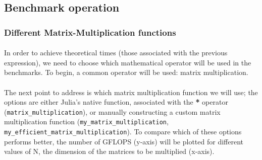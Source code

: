\subsection{Benchmark operation}
\subsubsection{Different Matrix-Multiplication functions}

     \paragraph*{}
     In order to achieve theoretical times (those associated with the previous expression), we need to 
     choose which mathematical operator will be used in the benchmarks. To begin, a common operator 
     will be used: matrix multiplication.

     \paragraph{}
     The next point to address is which matrix multiplication function we will use; the options are 
     either Julia's native function, associated with the \textbf{*} operator (\texttt{matrix\_multiplication}), or manually 
     constructing a custom matrix multiplication function (\texttt{my\_matrix\_multiplication}, \texttt{my\_efficient\_matrix\_multiplication}). To compare which of these options performs better, the number 
     of GFLOPS (y-axis) will be plotted for different values of N, the dimension of the matrices to 
     be multiplied (x-axis).

\vspace*{0.5cm}

\begin{comment}
    
\end{comment}


